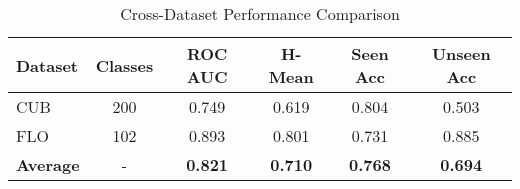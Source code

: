 
\begin{table}[htbp]
\centering
\caption{Cross-Dataset Performance Comparison}
\label{tab:cross_dataset}
\begin{tabular}{|l|c|c|c|c|c|}
\hline
\textbf{Dataset} & \textbf{Classes} & \textbf{ROC AUC} & \textbf{H-Mean} & \textbf{Seen Acc} & \textbf{Unseen Acc} \\
\hline
CUB & 200 & 0.749 & 0.619 & 0.804 & 0.503 \\
FLO & 102 & 0.893 & 0.801 & 0.731 & 0.885 \\
\hline
\textbf{Average} & - & \textbf{0.821} & \textbf{0.710} & \textbf{0.768} & \textbf{0.694} \\
\hline
\end{tabular}
\end{table}
